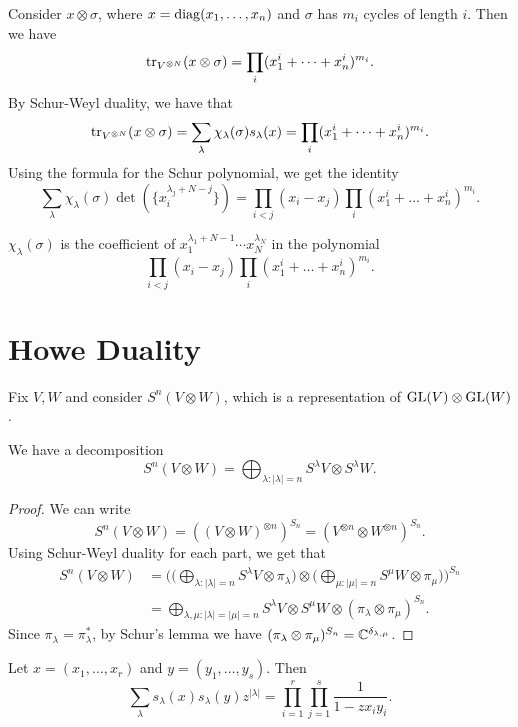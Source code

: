 \begin{example}
  Consider $x \otimes \sigma$, where
  $x = \operatorname{diag}(x_1, \dots, x_n)$ and
  $\sigma$ has $m_i$ cycles of
  length $i$. Then we have
  \[
    \operatorname{tr}_{V^{\otimes N}}(x \otimes \sigma)
    = \prod_i (x_1^i + \dots + x_n^i)^{m_i}.
  \]
  By Schur-Weyl duality, we have that
  \[
    \operatorname{tr}_{V^{\otimes N}}(x \otimes \sigma)
    = \sum_{\lambda} \chi_{\lambda}(\sigma) s_\lambda(x)
    = \prod_i (x_1^i + \dots + x_n^i)^{m_i}.
  \]
  Using the formula for the Schur
  polynomial, we get the identity
  \[
    \sum_{\lambda} \chi_\lambda(\sigma)
    \det(\{x_i^{\lambda_j + N - j}\})
    = \prod_{i < j} (x_i - x_j)
    \prod_i (x_1^i + \dots + x_n^i)^{m_i}.
  \]
\end{example}

\begin{theorem}
  $\chi_\lambda(\sigma)$ is the
  coefficient of $x_1^{\lambda_1 + N - 1} \cdots x_N^{\lambda_N}$
  in the polynomial
  \[\prod_{i < j} (x_i - x_j) \prod_i (x_1^i + \dots + x_n^i)^{m_i}.\]
\end{theorem}

\section{Howe Duality}

\begin{remark}
  Fix $V, W$ and consider
  $S^n(V \otimes W)$, which
  is a representation of
  $\operatorname{GL}(V) \otimes \operatorname{GL}(W)$.
\end{remark}

\begin{theorem}
  We have a decomposition
  \[
    S^n(V \otimes W)
    = \bigoplus_{\lambda : |\lambda| = n} S^\lambda V \otimes S^\lambda W.
  \]
\end{theorem}

\begin{proof}
  We can write
  \[
    S^n(V \otimes W)
    = ((V \otimes W)^{\otimes n})^{S_n}
    = (V^{\otimes n} \otimes W^{\otimes n})^{S_n}.
  \]
  Using Schur-Weyl duality for each
  part, we get that
  \begin{align*}
    S^n(V \otimes W)
    &= \Bigg(\Big(\bigoplus_{\lambda : |\lambda| = n} S^\lambda V \otimes \pi_\lambda\Big)
    \otimes 
    \Big(
      \bigoplus_{\mu : |\mu| = n}
      S^\mu W \otimes \pi_{\mu}
    \Big)\Bigg)^{S_n} \\
    &= \bigoplus_{\lambda, \mu : |\lambda| = |\mu| = n}
    S^{\lambda} V \otimes
    S^{\mu} W \otimes (\pi_\lambda \otimes \pi_\mu)^{S_n}.
  \end{align*}
  Since $\pi_\lambda = \pi_{\lambda}^*$,
  by Schur's lemma we have
  $(\pi_\lambda \otimes \pi_\mu)^{S_n} = \mathbb{C}^{\delta_{\lambda, \mu}}$.
\end{proof}

\begin{corollary}
  Let $x = (x_1, \dots, x_r)$ and
  $y = (y_1, \dots, y_s)$. Then
  \[
    \sum_\lambda
    s_\lambda(x) s_\lambda(y)
    z^{|\lambda|}
    = \prod_{i = 1}^r \prod_{j = 1}^s
    \frac{1}{1 - z x_i y_i}.
  \]
\end{corollary}
